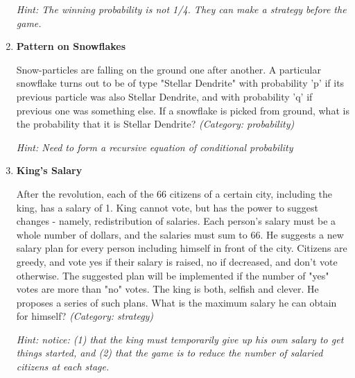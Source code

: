 \begin{enumerate}
\small\emph{Hint: The winning probability is not 1/4. They can make a strategy before the game.}





\item \textbf{Pattern on Snowflakes}

Snow-particles are falling on the ground one after another. A particular snowflake turns out to be of type "Stellar Dendrite" with probability 'p' if its previous particle was also Stellar Dendrite, and with probability 'q' if previous one was something else. If a snowflake is picked from ground, what is the probability that it is Stellar Dendrite?
\small\emph{(Category: probability)}

\small\emph{Hint: Need to form a recursive equation of conditional probability}





\item \textbf{King's Salary}

After the revolution, each of the 66 citizens of a certain city, including the king, has a salary of 1. King cannot vote, but has the power to suggest changes - namely, redistribution of salaries. Each person's salary must be a whole number of dollars, and the salaries must sum to 66. He suggests a new salary plan for every person including himself in front of the city. Citizens are greedy, and vote yes if their salary is raised, no if decreased, and don't vote otherwise.  The suggested plan will be implemented if the number of "yes" votes are more than "no" votes. The king is both, selfish and clever. He proposes a series of such plans. What is the maximum salary he can obtain for himself?
\small\emph{(Category: strategy)}

\small\emph{Hint: notice:  (1) that the king must temporarily give up his own salary to get things started, and (2) that the game is to reduce the number of salaried citizens at each stage.}





\end{enumerate}
